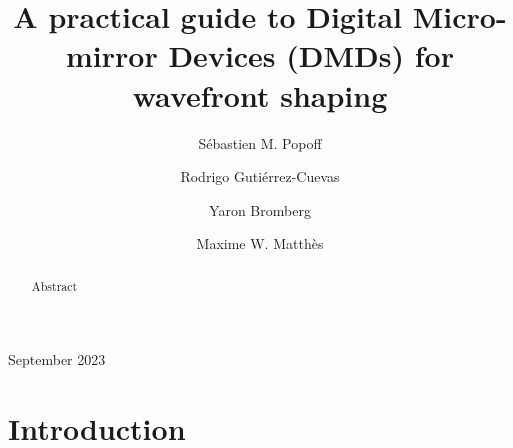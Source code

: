 \documentclass[12pt]{iopart}
\begin{document}
\title{A practical guide to Digital Micro-mirror Devices (DMDs) for wavefront shaping}

\author{Sébastien M. Popoff}
\address{Institut Langevin, ESPCI Paris, PSL University, CNRS, France}

\author{Rodrigo Gutiérrez-Cuevas}
\address{Institut Langevin, ESPCI Paris, PSL University, CNRS, France}

\author{Yaron Bromberg}
\address{Racah Institute of Physics, The Hebrew University of Jerusalem, Israel}

\author{Maxime W. Matthès}
\address{Institut Langevin, ESPCI Paris, PSL University, CNRS, France}

\vspace{10pt}
\begin{indented}
\item[]September 2023
\end{indented}

\begin{abstract}
Abstract
\end{abstract}

%
%
%
% 
%

\section{Introduction}
\end{document}
